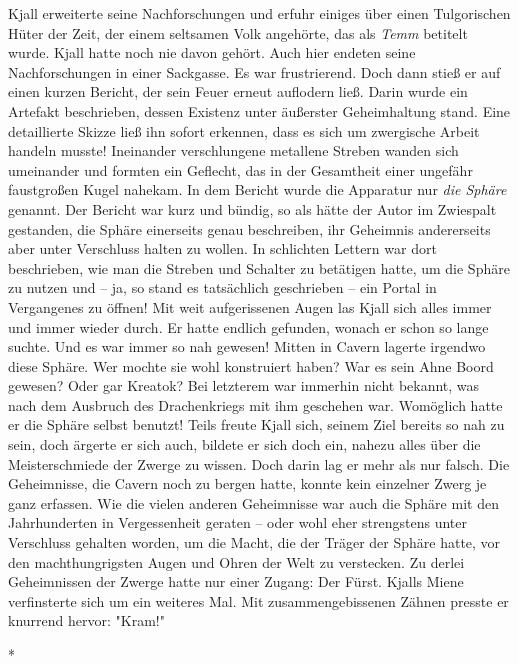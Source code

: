 \documentclass[10pt, a4paper, oneside]{book}
\begin{document}
\begin{multicols}{2}
Kjall erweiterte seine Nachforschungen und erfuhr einiges über einen Tulgorischen Hüter der Zeit, der einem seltsamen Volk angehörte, das als \textit{Temm} betitelt wurde. Kjall hatte noch nie davon gehört. Auch hier endeten seine Nachforschungen in einer Sackgasse. Es war frustrierend. Doch dann stieß er auf einen kurzen Bericht, der sein Feuer erneut auflodern ließ. Darin wurde ein Artefakt beschrieben, dessen Existenz unter äußerster Geheimhaltung stand. Eine detaillierte Skizze ließ ihn sofort erkennen, dass es sich um zwergische Arbeit handeln musste! Ineinander verschlungene metallene Streben wanden sich umeinander und formten ein Geflecht, das in der Gesamtheit einer ungefähr faustgroßen Kugel nahekam. In dem Bericht wurde die Apparatur nur \textit{die Sphäre} genannt. Der Bericht war kurz und bündig, so als hätte der Autor im Zwiespalt gestanden, die Sphäre einerseits genau beschreiben, ihr Geheimnis andererseits aber unter Verschluss halten zu wollen. In schlichten Lettern war dort beschrieben, wie man die Streben und Schalter zu betätigen hatte, um die Sphäre zu nutzen und – ja, so stand es tatsächlich geschrieben – ein Portal in Vergangenes zu öffnen! Mit weit aufgerissenen Augen las Kjall sich alles immer und immer wieder durch. Er hatte endlich gefunden, wonach er schon so lange suchte. Und es war immer so nah gewesen! Mitten in Cavern lagerte irgendwo diese Sphäre. Wer mochte sie wohl konstruiert haben? War es sein Ahne Boord gewesen? Oder gar Kreatok? Bei letzterem war immerhin nicht bekannt, was nach dem Ausbruch des Drachenkriegs mit ihm geschehen war. Womöglich hatte er die Sphäre selbst benutzt! Teils freute Kjall sich, seinem Ziel bereits so nah zu sein, doch ärgerte er sich auch, bildete er sich doch ein, nahezu alles über die Meisterschmiede der Zwerge zu wissen. Doch darin lag er mehr als nur falsch. Die Geheimnisse, die Cavern noch zu bergen hatte, konnte kein einzelner Zwerg je ganz erfassen. Wie die vielen anderen Geheimnisse war auch die Sphäre mit den Jahrhunderten in Vergessenheit geraten – oder wohl eher strengstens unter Verschluss gehalten worden, um die Macht, die der Träger der Sphäre hatte, vor den machthungrigsten Augen und Ohren der Welt zu verstecken. Zu derlei Geheimnissen der Zwerge hatte nur einer Zugang: Der Fürst. Kjalls Miene verfinsterte sich um ein weiteres Mal. Mit zusammengebissenen Zähnen presste er knurrend hervor: "Kram!" 

\begin{center}
    *
\end{center}


\end{multicols}
\end{document}
